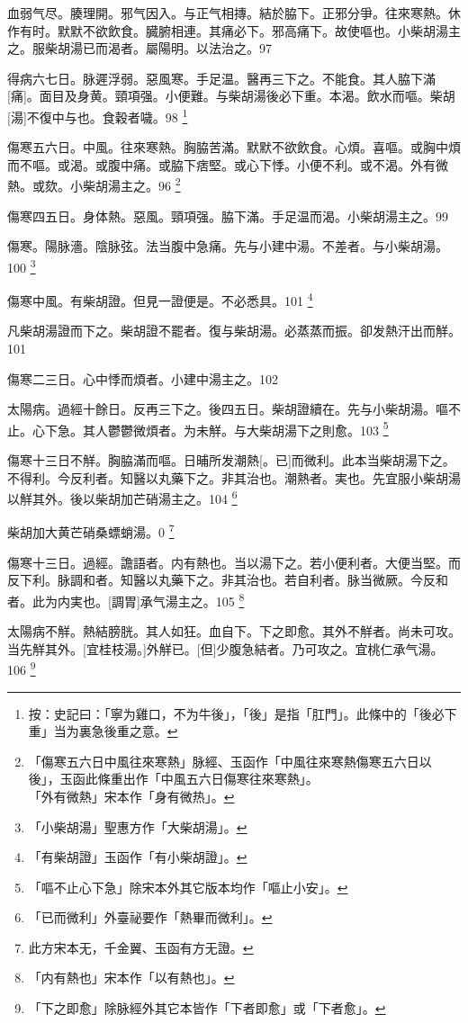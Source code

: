\documentclass[12pt,twoside,UTF8,b5paper]{ctexbook}
\begin{document}
血弱气尽。腠理開。邪气因入。与正气相摶。結於脇下。正邪分爭。往來寒熱。休作有时。默默不欲飲食。臓腑相連。其痛必下。邪高痛下。故使嘔也。小柴胡湯主之。服柴胡湯已而渴者。屬陽明。以法治之。97

得病六七日。脉遲浮弱。惡風寒。手足温。醫再三下之。不能食。其人脇下滿[痛]。面目及身黄。頸項强。小便難。与柴胡湯後必下重。本渴。飲水而嘔。柴胡[湯]不復中与也。食穀者噦。98
	\footnote{按：史記曰：「寧为雞口，不为牛後」，「後」是指「肛門」。此條中的「後必下重」当为裏急後重之意。}

傷寒五六日。中風。往來寒熱。胸脇苦滿。默默不欲飲食。心煩。喜嘔。或胸中煩而不嘔。或渴。或腹中痛。或脇下痞堅。或心下悸。小便不利。或不渴。外有微熱。或欬。小柴胡湯主之。96
	\footnote{「傷寒五六日中風往來寒熱」脉經、玉函作「中風往來寒熱傷寒五六日以後」，玉函此條重出作「中風五六日傷寒往來寒熱」。\\「外有微熱」宋本作「身有微热」。}

傷寒四五日。身体熱。惡風。頸項强。脇下滿。手足温而渴。小柴胡湯主之。99

傷寒。陽脉濇。陰脉弦。法当腹中急痛。先与小建中湯。不差者。与小柴胡湯。100
	\footnote{「小柴胡湯」聖惠方作「大柴胡湯」。}

傷寒中風。有柴胡證。但見一證便是。不必悉具。101
	\footnote{「有柴胡證」玉函作「有小柴胡證」。}

凡柴胡湯證而下之。柴胡證不罷者。復与柴胡湯。必蒸蒸而振。卻发熱汗出而觧。101

傷寒二三日。心中悸而煩者。小建中湯主之。102

太陽病。過經十餘日。反再三下之。後四五日。柴胡證續在。先与小柴胡湯。嘔不止。心下急。其人鬱鬱微煩者。为未觧。与大柴胡湯下之則愈。103
	\footnote{「嘔不止心下急」除宋本外其它版本均作「嘔止小安」。}

傷寒十三日不觧。胸脇滿而嘔。日晡所发潮熱[。已]而微利。此本当柴胡湯下之。不得利。今反利者。知醫以丸藥下之。非其治也。潮熱者。実也。先宜服小柴胡湯以觧其外。後以柴胡加芒硝湯主之。104
	\footnote{「已而微利」外臺祕要作「熱畢而微利」。}

柴胡加大黄芒硝桑螵蛸湯。0
	\footnote{此方宋本无，千金翼、玉函有方无證。}

傷寒十三日。過經。譫語者。内有熱也。当以湯下之。若小便利者。大便当堅。而反下利。脉調和者。知醫以丸藥下之。非其治也。若自利者。脉当微厥。今反和者。此为内実也。[調胃]承气湯主之。105
	\footnote{「内有熱也」宋本作「以有熱也」。}

太陽病不觧。熱結膀胱。其人如狂。血自下。下之即愈。其外不觧者。尚未可攻。当先觧其外。[宜桂枝湯。]外觧已。[但]少腹急結者。乃可攻之。宜桃仁承气湯。106
	\footnote{「下之即愈」除脉經外其它本皆作「下者即愈」或「下者愈」。}
\end{document}
